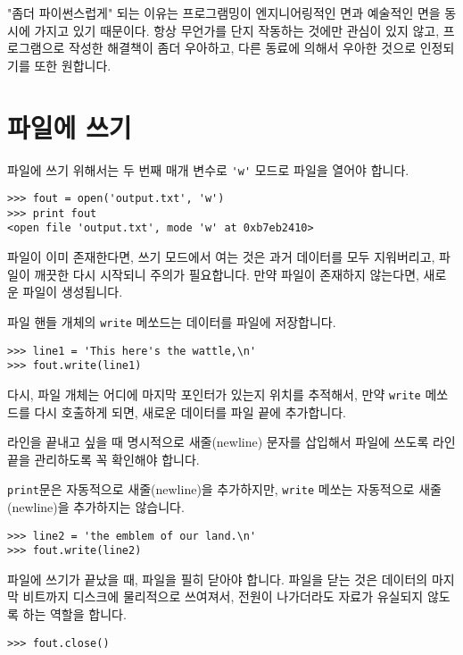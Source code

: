 "좀더 파이썬스럽게" 되는 이유는 프로그램밍이 엔지니어링적인 면과 예술적인 면을 동시에 가지고 있기 때문이다.
항상 무언가를 단지 작동하는 것에만 관심이 있지 않고, 프로그램으로 작성한 해결책이 좀더 우아하고, 다른 동료에 의해서 우아한 것으로 인정되기를 또한 원합니다.

\section{파일에 쓰기}


파일에 쓰기 위해서는 두 번째 매개 변수로 \verb"'w'" 모드로 파일을 열어야 합니다.

\beforeverb
\begin{verbatim}
>>> fout = open('output.txt', 'w')
>>> print fout
<open file 'output.txt', mode 'w' at 0xb7eb2410>
\end{verbatim}
\afterverb
%

파일이 이미 존재한다면, 쓰기 모드에서 여는 것은 과거 데이터를 모두 지워버리고, 
파일이 깨끗한 다시 시작되니 주의가 필요합니다. 만약 파일이 존재하지 않는다면, 새로운 파일이 생성됩니다.

파일 핸들 개체의 {\tt write} 메쏘드는 데이터를 파일에 저장합니다.

\beforeverb
\begin{verbatim}
>>> line1 = 'This here's the wattle,\n'
>>> fout.write(line1)
\end{verbatim}
\afterverb
%

다시, 파일 개체는 어디에 마지막 포인터가 있는지 위치를 추적해서, 만약 {\tt write} 메쏘드를 다시 호출하게 되면, 새로운 데이터를 파일 끝에 추가합니다.

라인을 끝내고 싶을 때 명시적으로 새줄(newline) 문자를 삽입해서 파일에 쓰도록 라인 끝을 관리하도록 꼭 확인해야 합니다.

{\tt print}문은 자동적으로 새줄(newline)을 추가하지만, {\tt write} 메쏘는 자동적으로 새줄(newline)을 추가하지는 않습니다.

\beforeverb
\begin{verbatim}
>>> line2 = 'the emblem of our land.\n'
>>> fout.write(line2)
\end{verbatim}
\afterverb
%

파일에 쓰기가 끝났을 때, 파일을 필히 닫아야 합니다.
파일을 닫는 것은 데이터의 마지막 비트까지 디스크에 물리적으로 쓰여져서, 전원이 나가더라도 자료가 유실되지 않도록 하는 역할을 합니다.

\beforeverb
\begin{verbatim}
>>> fout.close()
\end{verbatim}
\afterverb
%

